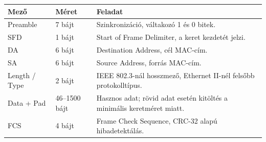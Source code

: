 
\begin{tabularx}{\textwidth}{L{28mm}L{22mm}X}
\toprule
\textbf{Mező} & \textbf{Méret} & \textbf{Feladat} \\
\midrule
Preamble & 7 bájt & Szinkronizáció, váltakozó 1 és 0 bitek. \\
SFD & 1 bájt & Start of Frame Delimiter, a keret kezdetét jelzi. \\
DA & 6 bájt & Destination Address, cél MAC-cím. \\
SA & 6 bájt & Source Address, forrás MAC-cím. \\
Length / Type & 2 bájt & IEEE 802.3-nál hosszmező, Ethernet II-nél felsőbb protokolltípus. \\
Data + Pad & 46--1500 bájt & Hasznos adat; rövid adat esetén kitöltés a minimális keretméret miatt. \\
FCS & 4 bájt & Frame Check Sequence, CRC-32 alapú hibadetektálás. \\
\bottomrule
\end{tabularx}
